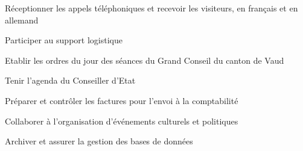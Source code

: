 

\begin{cvskills}

  \begin{minipage}[t]{0.45\textwidth}
    \cvskill
      {Réceptionner les appels téléphoniques et recevoir les visiteurs, en français et en allemand}
  \end{minipage}\hfill
  \begin{minipage}[t]{0.45\textwidth}
    \cvskill
      {Participer au support logistique}
  \end{minipage}

  \begin{minipage}[t]{0.45\textwidth}
    \cvskill
      {Etablir les ordres du jour des séances du Grand Conseil du canton de Vaud}
  \end{minipage}\hfill
  \begin{minipage}[t]{0.45\textwidth}
    \cvskill
      {Tenir l’agenda du Conseiller d’Etat}
  \end{minipage}

  \begin{minipage}[t]{0.45\textwidth}
    \cvskill
      {Préparer et contrôler les factures pour l’envoi à la comptabilité}
  \end{minipage}\hfill
  \begin{minipage}[t]{0.45\textwidth}
    \cvskill
      {Collaborer à l’organisation d’événements culturels et politiques}
  \end{minipage}

  \cvskill
    {Archiver et assurer la gestion des bases de données}

\end{cvskills}
